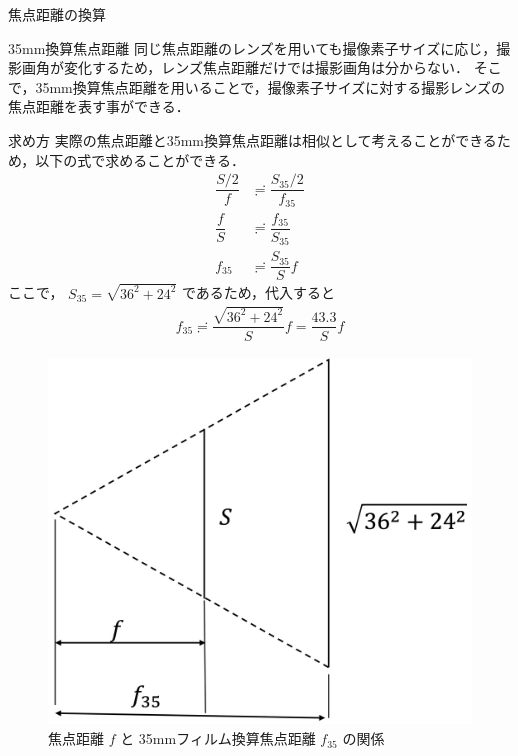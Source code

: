 \documentclass[8pt, jfont=ipaexm, t]{beamer} %
\begin{document}
\begin{frame}[allowframebreaks]{焦点距離の換算}
  \begin{block}{35mm換算焦点距離}
    同じ焦点距離のレンズを用いても撮像素子サイズに応じ，撮影画角が変化するため，レンズ焦点距離だけでは撮影画角は分からない．
    そこで，35mm換算焦点距離を用いることで，撮像素子サイズに対する撮影レンズの焦点距離を表す事ができる．
  \end{block}
  \newpage

\begin{block}{求め方}
  \tiny
  実際の焦点距離と35mm換算焦点距離は相似として考えることができるため，以下の式で求めることができる．
  \begin{align*}
    \dfrac{S / 2}{f} &\risingdotseq \dfrac{S_{35} / 2}{f_{35}} \\
    \dfrac{f}{S} &\risingdotseq \dfrac{f_{35}}{S_{35}}  \\
    f_{35} &\risingdotseq \dfrac{S_{35}}{S}f
  \end{align*}
  ここで， $S_{35} = \sqrt{36^2 + 24^2}$ であるため，代入すると
  \begin{align*}
    f_{35} \risingdotseq \dfrac{\sqrt{36^2 + 24^2}}{S} f = \dfrac{43.3}{S}f
  \end{align*}
\end{block}
\begin{figure}[H]
  \centering
  \includegraphics[scale=0.137]{figure/03.png}
  \caption{焦点距離 $f$ と 35mmフィルム換算焦点距離 $f_{35}$ の関係}
  \label{fig:03}
\end{figure}
\end{frame}
\end{document}
